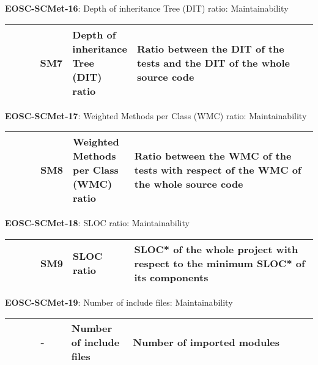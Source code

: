 \textbf{EOSC-SCMet-16}: Depth of inheritance Tree (DIT) ratio: Maintainability
\nopagebreak[4]
\begin{center}
    \tabletail{\hline}
    \tiny
    \begin{supertabular}{|p{0.10\linewidth}|p{0.10\linewidth}|p{0.20\linewidth}|p{0.60\linewidth}|} \hline
        \cite{nagappan_early_2005} & SM7 & Depth of inheritance Tree (DIT) ratio & Ratio between the DIT of the tests and the DIT of the whole source code\\ \hline
    \end{supertabular}
\end{center}

\textbf{EOSC-SCMet-17}: Weighted Methods per Class (WMC) ratio: Maintainability
\nopagebreak[4]
\begin{center}
    \tabletail{\hline}
    \tiny
    \begin{supertabular}{|p{0.10\linewidth}|p{0.10\linewidth}|p{0.20\linewidth}|p{0.60\linewidth}|} \hline
        \cite{nagappan_early_2005} & SM8 & Weighted Methods per Class (WMC) ratio & Ratio between the WMC of the tests with respect of the WMC of the whole source code\\ \hline
    \end{supertabular}
\end{center}

\textbf{EOSC-SCMet-18}: SLOC ratio: Maintainability
\nopagebreak[4]
\begin{center}
    \tabletail{\hline}
    \tiny
    \begin{supertabular}{|p{0.10\linewidth}|p{0.10\linewidth}|p{0.20\linewidth}|p{0.60\linewidth}|} \hline
        \cite{nagappan_early_2005} & SM9 & SLOC ratio & SLOC* of the whole project with respect to the minimum SLOC* of its components\\ \hline
    \end{supertabular}
\end{center}

\textbf{EOSC-SCMet-19}: Number of include files: Maintainability
\nopagebreak[4]
\begin{center}
    \tabletail{\hline}
    \tiny
    \begin{supertabular}{|p{0.10\linewidth}|p{0.10\linewidth}|p{0.20\linewidth}|p{0.60\linewidth}|} \hline
        \cite{tanaka_software_1998} & - & Number of include files & Number of imported modules\\ \hline
    \end{supertabular}
\end{center}

